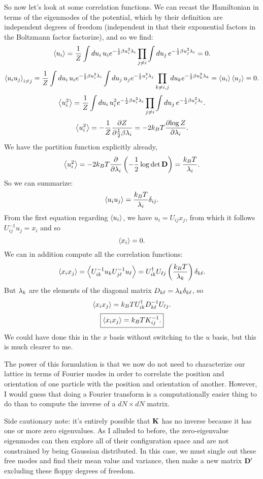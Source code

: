 \documentclass[12pt]{article}
\begin{document}
So now let's look at some correlation functions. We can recast the Hamiltonian in terms of the eigenmodes of the potential, which by their definition are independent degrees of freedom (independent in that their exponential factors in the Boltzmann factor factorize), and so we find:
\[ \left \langle u_i \right \rangle = \frac{1}{Z} \int du_i \, u_i e^{-\frac{1}{2} \beta u_i^2 \lambda_i} \prod_{j\neq i} \int du_j \, e^{-\frac{1}{2}\beta u_j^2 \lambda_i} = 0.\]
\[ \left \langle u_i u_j \right \rangle_{i\neq j} = \frac{1}{Z} \int du_i \, u_i e^{-\frac{1}{2} \beta u_i^2 \lambda_i} \int du_j \, u_j e^{-\frac{1}{2} u_j^2 \lambda _ j} \prod_{k \neq i,j} du_k e^{-\frac{1}{2} \beta u_k^2 \lambda_k} = \left \langle u_i \right \rangle\left \langle u_j \right \rangle = 0.\]
\[ \left \langle u_i^2 \right \rangle = \frac{1}{Z} \int du_i \, u_i^2 e^{-\frac{1}{2} \beta u_i^2 \lambda_i} \prod_{j\neq i} \int du_j \, e^{-\frac{1}{2}\beta u_j^2 \lambda_i}.\]
\[ \left \langle u_i^2 \right \rangle = -\frac{1}{Z} \frac{\partial {Z}}{\partial {\frac{1}{2} \beta\lambda_i}} = -2k_BT \frac{\partial {\log Z}}{\partial {\lambda_i}}.\]
We have the partition function explicitly already,
\[ \left \langle u_i^2 \right \rangle = -2k_BT \frac{\partial {}}{\partial {\lambda_i}} \left( -\frac{1}{2} \log \det \mathbf{D}\right) = \frac{k_BT}{\lambda_i}.\]
So we can summarize:
\[ \left \langle u_iu_j \right \rangle = \frac{k_BT}{\lambda_i}\delta_{ij}.\]
From the first equation regarding $\left \langle u_i \right \rangle$, we have $u_i = U_{ij} x_j$, from which it follows $U^{-1}_{ij} u_j = x_i$ and so
\[ \left \langle x_i \right \rangle = 0.\]
We can in addition compute all the correlation functions:
\[ \left \langle x_i x_j \right \rangle = \left \langle U^{-1}_{ik}u_k U^{-1}_{j\ell}u_\ell \right \rangle = U^\dagger_{ik} U_{\ell j} \left(\frac{k_BT}{\lambda_k}\right)\delta_{k\ell}.\]
But $\lambda_k$ are the elements of the diagonal matrix $D_{k\ell} = \lambda_k \delta_{k\ell}$, so
\[ \left \langle x_i x_j \right \rangle = k_BT U^\dagger_{ik} D^{-1}_{k\ell} U_{\ell j}.\]
\[ \boxed{\left \langle x_i x_j \right \rangle = k_BT K^{-1}_{ij}.}\]
We could have done this in the $x$ basis without switching to the $u$ basis, but this is much clearer to me.

The power of this formulation is that we now do not need to characterize our lattice in terms of Fourier modes in order to correlate the position and orientation of one particle with the position and orientation of another. However, I would guess that doing a Fourier transform is a computationally easier thing to do than to compute the inverse of a $dN \times dN$ matrix.

Side cautionary note: it's entirely possible that $\mathbf{K}$ has no inverse because it has one or more zero eigenvalues. As I alluded to before, the zero-eigenvalue eigenmodes can then explore all of their configuration space and are not constrained by being Gaussian distributed. In this case, we must single out these free modes and find their mean value and variance, then make a new matrix $\mathbf{D}'$ excluding these floppy degrees of freedom.



\end{document}
